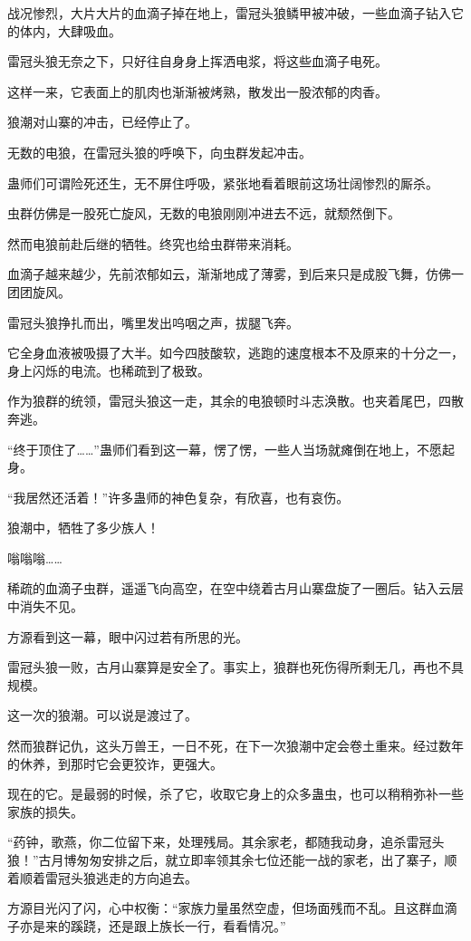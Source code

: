 \begin{this_body}
战况惨烈，大片大片的血滴子掉在地上，雷冠头狼鳞甲被冲破，一些血滴子钻入它的体内，大肆吸血。

雷冠头狼无奈之下，只好往自身身上挥洒电浆，将这些血滴子电死。

这样一来，它表面上的肌肉也渐渐被烤熟，散发出一股浓郁的肉香。

狼潮对山寨的冲击，已经停止了。

无数的电狼，在雷冠头狼的呼唤下，向虫群发起冲击。

蛊师们可谓险死还生，无不屏住呼吸，紧张地看着眼前这场壮阔惨烈的厮杀。

虫群仿佛是一股死亡旋风，无数的电狼刚刚冲进去不远，就颓然倒下。

然而电狼前赴后继的牺牲。终究也给虫群带来消耗。

血滴子越来越少，先前浓郁如云，渐渐地成了薄雾，到后来只是成股飞舞，仿佛一团团旋风。

雷冠头狼挣扎而出，嘴里发出呜咽之声，拔腿飞奔。

它全身血液被吸摄了大半。如今四肢酸软，逃跑的速度根本不及原来的十分之一，身上闪烁的电流。也稀疏到了极致。

作为狼群的统领，雷冠头狼这一走，其余的电狼顿时斗志涣散。也夹着尾巴，四散奔逃。

“终于顶住了……”蛊师们看到这一幕，愣了愣，一些人当场就瘫倒在地上，不愿起身。

“我居然还活着！”许多蛊师的神色复杂，有欣喜，也有哀伤。

狼潮中，牺牲了多少族人！

嗡嗡嗡……

稀疏的血滴子虫群，遥遥飞向高空，在空中绕着古月山寨盘旋了一圈后。钻入云层中消失不见。

方源看到这一幕，眼中闪过若有所思的光。

雷冠头狼一败，古月山寨算是安全了。事实上，狼群也死伤得所剩无几，再也不具规模。

这一次的狼潮。可以说是渡过了。

然而狼群记仇，这头万兽王，一日不死，在下一次狼潮中定会卷土重来。经过数年的休养，到那时它会更狡诈，更强大。

现在的它。是最弱的时候，杀了它，收取它身上的众多蛊虫，也可以稍稍弥补一些家族的损失。

“药钟，歌燕，你二位留下来，处理残局。其余家老，都随我动身，追杀雷冠头狼！”古月博匆匆安排之后，就立即率领其余七位还能一战的家老，出了寨子，顺着顺着雷冠头狼逃走的方向追去。

方源目光闪了闪，心中权衡：“家族力量虽然空虚，但场面残而不乱。且这群血滴子亦是来的蹊跷，还是跟上族长一行，看看情况。”


\end{this_body}
